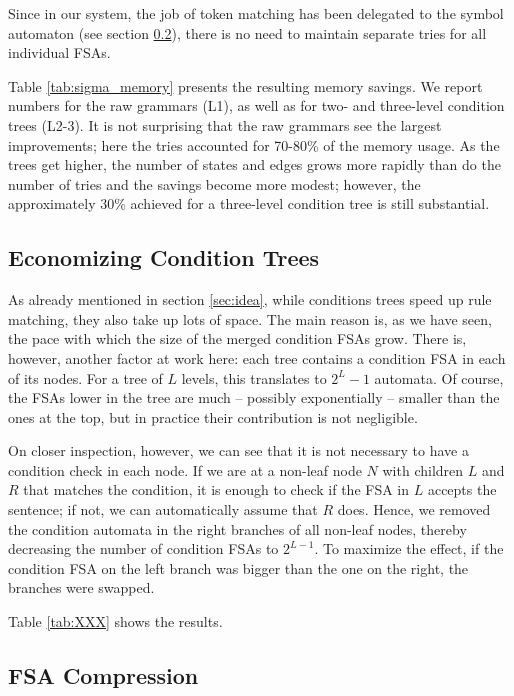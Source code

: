 \documentclass{article}
\begin{document}
Since in our system, the job of token matching has been delegated to the symbol
automaton (see section \ref{}), there is no need to maintain separate tries for
all individual FSAs. 

Table \ref{tab:sigma_memory} presents the resulting memory savings.
We report numbers for the raw grammars (L1), as well as for two- and three-level
condition trees (L2-3). It is not surprising that the raw grammars see the
largest improvements; here the tries accounted for 70-80\% of the memory
usage. As the trees get higher, the number of states and edges grows more
rapidly than do the number of tries and the savings become more modest; however,
the approximately 30\% achieved for a three-level condition tree is still
substantial.  %

\subsection{Economizing Condition Trees}

As already mentioned in section \ref{sec:idea}, while conditions trees speed up
rule matching, they also take up lots of space. The main reason is, as we have
seen, the pace with which the size of the merged condition FSAs grow. There is,
however, another factor at work here: each tree contains a condition FSA in each
of its nodes. For a tree of $L$ levels, this translates to $2^L - 1$ automata.
Of course, the FSAs lower in the tree are much -- possibly exponentially --
smaller than the ones at the top, but in practice their contribution is not
negligible.

On closer inspection, however, we can see that it is not necessary to have a
condition check in each node. If we are at a non-leaf node $N$ with children
$L$ and $R$ that matches the condition, it is enough to check if the FSA in
$L$ accepts the sentence; if not, we can automatically assume that $R$ does.
Hence, we removed the condition automata in the right branches of all non-leaf
nodes, thereby decreasing the number of condition FSAs to $2^{L-1}$. To maximize
the effect, if the condition FSA on the left branch was bigger than the one on
the right, the branches were swapped.

Table \ref{tab:XXX} shows the results.

\subsection{FSA Compression}
\end{document}
